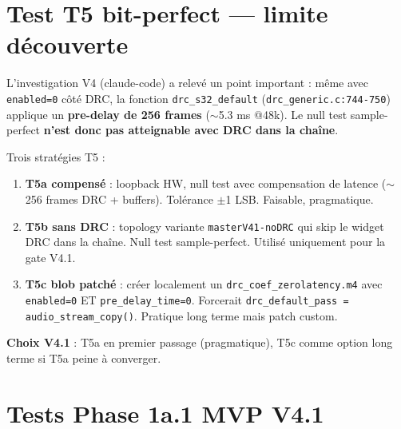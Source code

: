 \documentclass[11pt,a4paper]{article}
\begin{document}
\section{Test T5 bit-perfect --- limite découverte}\label{sec:t5}

L'investigation V4 (claude-code) a relevé un point important : même avec \texttt{enabled=0} côté DRC, la fonction \texttt{drc\_s32\_default} (\texttt{drc\_generic.c:744-750}) applique un \textbf{pre-delay de 256 frames} ($\sim$5.3 ms @48k). Le null test sample-perfect \textbf{n'est donc pas atteignable avec DRC dans la chaîne}.

Trois stratégies T5 :

\begin{enumerate}[leftmargin=*, itemsep=1pt]
  \item \textbf{T5a compensé} : loopback HW, null test avec compensation de latence ($\sim$256 frames DRC + buffers). Tolérance $\pm$1 LSB. Faisable, pragmatique.
  \item \textbf{T5b sans DRC} : topology variante \texttt{masterV41-noDRC} qui skip le widget DRC dans la chaîne. Null test sample-perfect. Utilisé uniquement pour la gate V4.1.
  \item \textbf{T5c blob patché} : créer localement un \texttt{drc\_coef\_zerolatency.m4} avec \texttt{enabled=0} ET \texttt{pre\_delay\_time=0}. Forcerait \texttt{drc\_default\_pass = audio\_stream\_copy()}. Pratique long terme mais patch custom.
\end{enumerate}

\textbf{Choix V4.1} : T5a en premier passage (pragma\-tique), T5c comme option long terme si T5a peine à converger.

\section{Tests Phase 1a.1 MVP V4.1}
\end{document}
